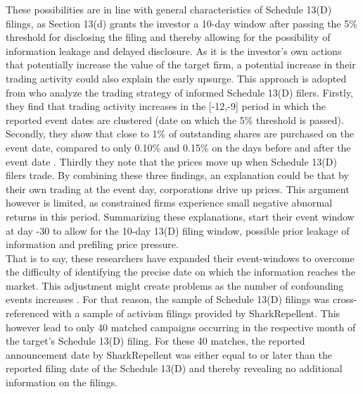 \documentclass[12pt]{article}
\begin{document}
These possibilities are in line with general characteristics of Schedule 13(D) filings, as Section 13(d) grants the investor a 10-day window after passing the 5\% threshold for disclosing the filing and thereby allowing for the possibility of information leakage and delayed disclosure. 
As it is the investor's own actions that potentially increase the value of the target firm, a potential increase in their trading activity could also explain the early upsurge. This approach is adopted from  \citet[p.1561]{Collin-Dufresne2015} who analyze the trading strategy of informed Schedule 13(D) filers. Firstly, they find that trading activity increases in the [-12,-9] period in which the reported event dates are clustered (date on which the 5\% threshold is passed). Secondly, they show that close to 1\% of outstanding shares are purchased on the event date, compared to only 0.10\% and 0.15\% on the days before and after the event date \citep[p.1561]{Collin-Dufresne2015}. Thirdly they note that the prices move up when Schedule 13(D) filers trade. By combining these three findings, an explanation could be that by their own trading at the event day, corporations drive up prices. This argument however is limited, as constrained firms experience small negative abnormal returns in this period. Summarizing these explanations, \citet[p.207]{Klein2009} start their event window at day -30 to allow for the 10-day 13(D) filing window, possible prior leakage of information and prefiling price pressure.\\
That is to say, these researchers have expanded their event-windows to overcome the difficulty of identifying the precise date on which the information reaches the market. This adjustment might create problems as the number of confounding events increases \citep[p.352]{mcwilliams1999}. For that reason, the sample of Schedule 13(D) filings was cross-referenced with a sample of activism filings provided by SharkRepellent. This however lead to only 40 matched campaigns occurring in the respective month of the target's Schedule 13(D) filing. For these 40 matches, the reported announcement date by SharkRepellent was either equal to or later than the reported filing date of the Schedule 13(D) and thereby revealing no additional information on the filings.
\end{document}
